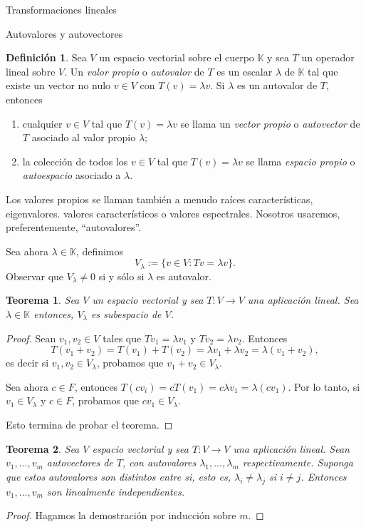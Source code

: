 \documentclass[a4paper,12pt,twoside,spanish,reqno]{amsbook}
\newtheorem{teorema}{Teorema}[section]
\theoremstyle{definition}
\newtheorem{definicion}{Definici\'on}[section]
\theoremstyle{remark}
\newcommand{\K}{\mathbb K}
\begin{document}
\begin{chapter}{Transformaciones lineales}
\begin{section}{Autovalores y autovectores}
		\begin{definicion}
			Sea $V$ un espacio vectorial sobre el cuerpo $\K$ y sea $T$ un operador lineal sobre $V$. Un \textit{valor propio} o \textit{autovalor} de $T$ es un escalar $\lambda$ de $\K$ tal que existe un vector no nulo $v \in V$ con $T(v) = \lambda v$. Si $\lambda$ es un autovalor de $T$, entonces
			\begin{enumerate}
				\item  cualquier  $v \in V$ tal que $T(v) = \lambda v$  se llama un \textit{vector propio} o  \textit{autovector} de $T$ asociado al valor propio $\lambda$;
				\item la colección de todos los $v \in V$ tal que $T(v) = \lambda v$  se llama \textit{espacio propio} o \textit{autoespacio} 	asociado a $\lambda$.
			\end{enumerate}
			
			Los valores propios se llaman también a menudo raíces características, eigenvalores. valores característicos o valores espectrales. Nosotros usaremos, preferentemente, ``autovalores''.
			
			Sea ahora $\lambda \in \K$, definimos
			$$
			V_\lambda := \{v \in V: Tv = \lambda v \}.
			$$
			Observar que $V_\lambda \ne 0$ si y sólo si $\lambda$ es autovalor. 
		\end{definicion}
		
		
		\begin{teorema}
			Sea $V$ un espacio vectorial y sea $T:V \to V$ una aplicación lineal. Sea $\lambda \in \K$ entonces, $V_\lambda$  es subespacio de $V$.
		\end{teorema}
		\begin{proof}
			Sean $v_1,v_2 \in V$ tales que $Tv_1 = \lambda v_1$ y $Tv_2 = \lambda v_2$. Entonces
			$$
			T(v_1+v_2) = T(v_1)+ T(v_2) = \lambda v_1 + \lambda v_2 = \lambda (v_1 + v_2),
			$$
			es decir si  $v_1,v_2 \in V_\lambda$, probamos que $v_1+v_2 \in V_\lambda$. 
			
			Sea ahora $c \in F$, entonces $T(cv_i) = cT(v_1) = c\lambda v_1 = \lambda (cv_1)$. Por lo tanto, si  $v_1\in V_\lambda$ y $c \in F$, probamos que $cv_1 \in V_\lambda$.
			
			Esto termina de probar el teorema.
		\end{proof}

		
		
		\begin{teorema}
			Sea $V$ espacio vectorial y sea $T: V \to V$ una aplicación lineal.  Sean $v_1,\ldots,v_m$ autovectores de $T$, con autovalores $\lambda_1,\ldots,\lambda_m$ respectivamente. Suponga que estos  autovalores son distintos entre si, esto es, $\lambda_i \ne \lambda_j$ si $i \ne j$. Entonces $v_1,\ldots,v_m$ son linealmente independientes.
		\end{teorema}
		\begin{proof}
			Hagamos la demostración por inducción sobre $m$.
			

\end{proof}
\end{section}
\end{chapter}
\end{document}
